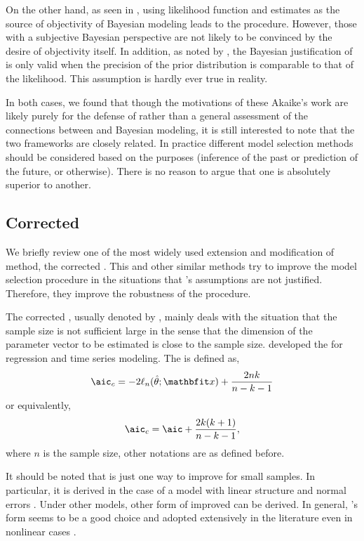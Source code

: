 On the other hand, as seen in \textcite{Akaike:1980gh}, using likelihood
function and \aic estimates as the source of objectivity of Bayesian
modeling leads to the \bic procedure. However, those with a subjective
Bayesian perspective are not likely to be convinced by the desire of
objectivity itself. In addition, as noted by \textcite{Kass:1995vb}, the
Bayesian justification of \aic is only valid when the precision of the prior
distribution is comparable to that of the likelihood. This assumption is
hardly ever true in reality.

In both cases, we found that though the motivations of these Akaike's work are
likely purely for the defense of \aic rather than a general assessment of the
connections between \aic and Bayesian modeling, it is still interested to note
that the two frameworks are closely related. In practice different model
selection methods should be considered based on the purposes (inference of the
past or prediction of the future, or otherwise). There is no reason to argue
that one is absolutely superior to another.

\subsection{Corrected \protect\aic}
\label{sub:Corrected aic}

We briefly review one of the most widely used extension and modification of
\aic method, the corrected \aic. This and other similar methods try to improve
the model selection procedure in the situations that
\textcite{Akaike:1973uc}'s assumptions are not justified. Therefore, they
improve the robustness of the \aic procedure.

The corrected \aic, usually denoted by \aicc, mainly deals with the situation
that the sample size is not sufficient large in the sense that the dimension
of the parameter vector to be estimated is close to the sample size.
\textcite{Hurvich:1989ev} developed the \aicc for regression and time series
modeling. The \aicc is defined as,
\begin{equation}
  \text{\aicc} = -2\ell_n(\hat\theta;\bfx) + \frac{2nk}{n-k-1}
\end{equation}
or equivalently,
\begin{equation}
  \text{\aicc} = \text{\aic} + \frac{2k(k+1)}{n-k-1},
\end{equation}
where $n$ is the sample size, other notations are as defined before.

It should be noted that \aicc is just one way to improve \aic for small
samples. In particular, it is derived in the case of a model with linear
structure and normal errors \parencite{Hurvich:1989ev, Burnham:2002wc}. Under
other models, other form of improved \aic can be derived. In general,
\textcite{Hurvich:1989ev}'s form seems to be a good choice and adopted
extensively in the literature even in nonlinear cases
\parencite[e.g.,][]{Turkheimer:2003iy}.


